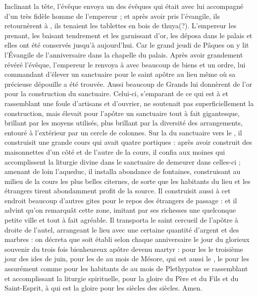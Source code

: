 Inclinant la tête, l'évêque envoya un des évêques qui était avec lui accompagné d'un très fidèle homme de l'empereur ; et après avoir pris l'évangile, ils retournèrent à , ils tenaient les tablettes en  bois de thuya(?). L'empereur les prenant, les baisant tendrement et les garnissant d'or, les déposa dans le palais et elles ont été conservés jusqu'à aujourd'hui.
Car le grand jeudi de Pâques on y lit l'Évangile de l'anniversaire dans la chapelle du palais.
Après avoir  grandement  révéré l'évêque, l'empereur le renvoya à  avec beaucoup de biens et un ordre, lui commandant d'élever un sanctuaire pour le saint apôtre  au lieu même où sa précieuse dépouille a été trouvée.
Aussi beaucoup de Grands lui donnèrent de l'or pour la construction du sanctuaire.
Celui-ci, s'emparant de ce qui est à  et rassemblant une foule d'artisans et d'ouvrier, ne soutenait pas superficiellement la construction, mais élevait pour l'apôtre un sanctuaire tout à fait gigantesque,  brillant par les moyens utilisés, plus brillant par la diversité des arrangements, entouré à l'extérieur par un cercle de colonnes. 
Sur la  du sanctuaire vers le , il construisit une  grande cours qui avait quatre portiques :
après avoir construit  des maisonnettes d'un côté et de l'autre de la cours,  il confia aux moines qui accomplissent la liturgie divine dans le sanctuaire de demeurer dans celles-ci ;
amenant de loin  l'aqueduc,  il installa abondance de fontaines, 
construisant au milieu de la cours les plus belles citernes, de sorte que les habitants du lieu et les étrangers tirent abondamment profit de la source.
Il construisit aussi à cet endroit  beaucoup d'autres gites pour le repos des étrangers de passage : et il advint qu'on remarquât cette zone, imitant par ses richesses une quelconque  petite ville et tout à fait agréable.
Il transporta le saint cercueil de l'apôtre à droite de l'autel, arrangeant le lieu avec  une certaine quantité d'argent et des marbres : on décreta que soit établi selon chaque anniversaire le jour du glorieux souvenir du trois fois bienheureux apôtre devenu martyr  :  %
 pour les  le troisième jour des ides de juin, %
 pour les  de  au mois de Mésore, qui est aussi le , le  %
 pour les  assurément comme pour les habitants de  au mois de Plethypatos 	%
 se rassemblant et accomplissant la liturgie spirituelle,
 pour la gloire du Père et du Fils et du Saint-Esprit,  à qui est la gloire pour les siècles des siècles. Amen.
 
